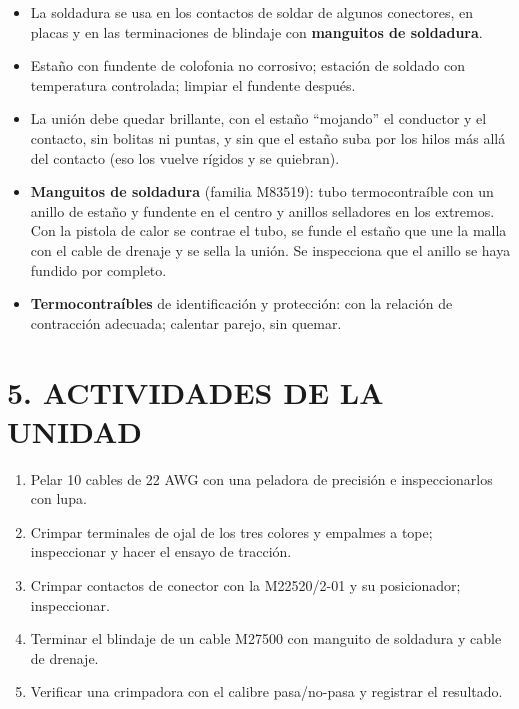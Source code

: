 \begin{itemize}
  \item La soldadura se usa en los contactos de soldar de algunos conectores, en placas y en las
        terminaciones de blindaje con \textbf{manguitos de soldadura}.
  \item Estaño con fundente de colofonia no corrosivo; estación de soldado con temperatura
        controlada; limpiar el fundente después.
  \item La unión debe quedar brillante, con el estaño ``mojando'' el conductor y el contacto, sin
        bolitas ni puntas, y sin que el estaño suba por los hilos más allá del contacto (eso los
        vuelve rígidos y se quiebran).
  \item \textbf{Manguitos de soldadura} (familia M83519): tubo termocontraíble con un anillo de
        estaño y fundente en el centro y anillos selladores en los extremos. Con la pistola de calor
        se contrae el tubo, se funde el estaño que une la malla con el cable de drenaje y se sella
        la unión. Se inspecciona que el anillo se haya fundido por completo.
  \item \textbf{Termocontraíbles} de identificación y protección: con la relación de contracción
        adecuada; calentar parejo, sin quemar.
\end{itemize}

\section*{5. ACTIVIDADES DE LA UNIDAD}
\begin{enumerate}
  \item Pelar 10 cables de 22 AWG con una peladora de precisión e inspeccionarlos con lupa.
  \item Crimpar terminales de ojal de los tres colores y empalmes a tope; inspeccionar y hacer el
        ensayo de tracción.
  \item Crimpar contactos de conector con la M22520/2-01 y su posicionador; inspeccionar.
  \item Terminar el blindaje de un cable M27500 con manguito de soldadura y cable de drenaje.
  \item Verificar una crimpadora con el calibre pasa/no-pasa y registrar el resultado.
\end{enumerate}

